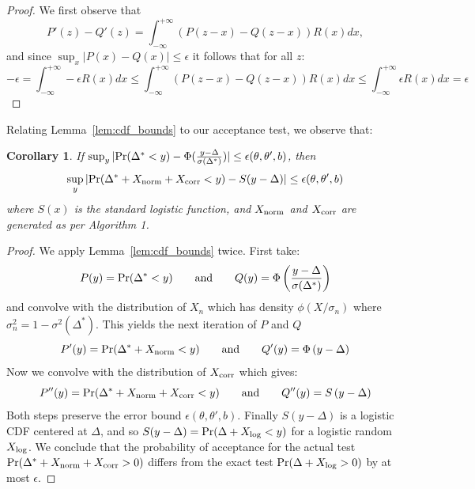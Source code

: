\documentclass{article}
\newtheorem{corollary}{Corollary}
\begin{document}
\begin{proof}
We first observe that
\begin{equation}\label{eq:pdf_difference}
    P'(z) - Q'(z) = \int_{-\infty}^{+\infty}(P(z-x)-Q(z-x))R(x) dx,
\end{equation}
and since $\sup_x|P(x)-Q(x)|\leq \epsilon$ it follows that for all $z$:
\begin{equation}
-\epsilon = \int_{-\infty}^{+\infty} -\epsilon R(x) dx \leq \int_{-\infty}^{+\infty}(P(z-x)-Q(z-x))R(x) dx \leq \int_{-\infty}^{+\infty}\epsilon R(x) dx = \epsilon
\end{equation}
\end{proof}

Relating Lemma~\ref{lem:cdf_bounds} to our acceptance test, we observe that:

\begin{corollary}\label{cor:bounds_preserved}
If $\sup_y|{\rm Pr}(\Delta^* < y) - \Phi(\frac{y-\Delta}{\sigma(\Delta^*)})|
\leq \epsilon(\theta,\theta',b)$, then
\begin{equation}
    \sup_y|{\rm Pr}(\Delta^*+X_{\rm norm}+X_{\rm corr} < y) - S(y-\Delta)| \leq \epsilon(\theta,\theta',b)
\end{equation}
where $S(x)$ is the standard logistic function, and $X_{\rm norm}$ and $X_{\rm corr}$ are generated as per Algorithm 1. 
\end{corollary}

\begin{proof}
We apply Lemma~\ref{lem:cdf_bounds} twice. First take:
\begin{equation}
    P(y) = {\rm Pr}(\Delta^* < y) \qquad {\rm and}\qquad Q(y) = \Phi\left(\frac{y-\Delta}{\sigma(\Delta^*)}\right)
\end{equation}
and convolve with the distribution of $X_n$ which has density $\phi(X/\sigma_n)$
where $\sigma_n^2 = 1 - \sigma^2(\Delta^*)$. This yields the next iteration of
$P$ and $Q$
\begin{equation}
    P'(y) = {\rm Pr}(\Delta^*+X_{\rm norm} < y) \qquad {\rm and}\qquad Q'(y) = \Phi\left({y-\Delta}\right)
\end{equation}
Now we convolve with the distribution of $X_{\rm corr}$ which gives:
\begin{equation}
    P''(y) = {\rm Pr}(\Delta^*+X_{\rm norm}+X_{\rm corr} < y) \qquad {\rm and}\qquad Q''(y) = S\left({y-\Delta}\right)
\end{equation}
Both steps preserve the error bound $\epsilon(\theta,\theta',b)$. Finally
$S(y-\Delta)$ is a logistic CDF centered at $\Delta$, and so $S(y-\Delta) = {\rm
Pr}(\Delta + X_{\rm log} < y)$ for a logistic random $X_{\rm log}$. We conclude
that the probability of acceptance for the actual test ${\rm Pr}(\Delta^*+X_{\rm
norm}+X_{\rm corr} > 0)$ differs from the exact test ${\rm Pr}(\Delta+X_{\rm
log} > 0)$ by at most $\epsilon$.
\end{proof}
\end{document}
